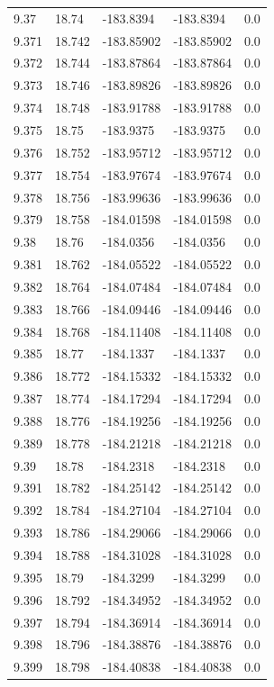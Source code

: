 \begin{tabular}{lllll}
9.37 & 18.74 & -183.8394 & -183.8394 & 0.0 \\
9.371 & 18.742 & -183.85902 & -183.85902 & 0.0 \\
9.372 & 18.744 & -183.87864 & -183.87864 & 0.0 \\
9.373 & 18.746 & -183.89826 & -183.89826 & 0.0 \\
9.374 & 18.748 & -183.91788 & -183.91788 & 0.0 \\
9.375 & 18.75 & -183.9375 & -183.9375 & 0.0 \\
9.376 & 18.752 & -183.95712 & -183.95712 & 0.0 \\
9.377 & 18.754 & -183.97674 & -183.97674 & 0.0 \\
9.378 & 18.756 & -183.99636 & -183.99636 & 0.0 \\
9.379 & 18.758 & -184.01598 & -184.01598 & 0.0 \\
9.38 & 18.76 & -184.0356 & -184.0356 & 0.0 \\
9.381 & 18.762 & -184.05522 & -184.05522 & 0.0 \\
9.382 & 18.764 & -184.07484 & -184.07484 & 0.0 \\
9.383 & 18.766 & -184.09446 & -184.09446 & 0.0 \\
9.384 & 18.768 & -184.11408 & -184.11408 & 0.0 \\
9.385 & 18.77 & -184.1337 & -184.1337 & 0.0 \\
9.386 & 18.772 & -184.15332 & -184.15332 & 0.0 \\
9.387 & 18.774 & -184.17294 & -184.17294 & 0.0 \\
9.388 & 18.776 & -184.19256 & -184.19256 & 0.0 \\
9.389 & 18.778 & -184.21218 & -184.21218 & 0.0 \\
9.39 & 18.78 & -184.2318 & -184.2318 & 0.0 \\
9.391 & 18.782 & -184.25142 & -184.25142 & 0.0 \\
9.392 & 18.784 & -184.27104 & -184.27104 & 0.0 \\
9.393 & 18.786 & -184.29066 & -184.29066 & 0.0 \\
9.394 & 18.788 & -184.31028 & -184.31028 & 0.0 \\
9.395 & 18.79 & -184.3299 & -184.3299 & 0.0 \\
9.396 & 18.792 & -184.34952 & -184.34952 & 0.0 \\
9.397 & 18.794 & -184.36914 & -184.36914 & 0.0 \\
9.398 & 18.796 & -184.38876 & -184.38876 & 0.0 \\
9.399 & 18.798 & -184.40838 & -184.40838 & 0.0 \\

\end{tabular}
